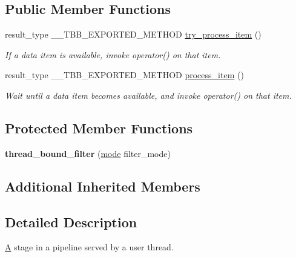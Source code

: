 \subsection*{Public Member Functions}
\begin{DoxyCompactItemize}
\item 
result\+\_\+type \+\_\+\+\_\+\+T\+B\+B\+\_\+\+E\+X\+P\+O\+R\+T\+E\+D\+\_\+\+M\+E\+T\+H\+O\+D \hyperlink{classtbb_1_1thread__bound__filter_a24e2c3a15f273ca9de5e7c99de68d12d}{try\+\_\+process\+\_\+item} ()
\begin{DoxyCompactList}\small\item\em If a data item is available, invoke operator() on that item. \end{DoxyCompactList}\item 
result\+\_\+type \+\_\+\+\_\+\+T\+B\+B\+\_\+\+E\+X\+P\+O\+R\+T\+E\+D\+\_\+\+M\+E\+T\+H\+O\+D \hyperlink{classtbb_1_1thread__bound__filter_ab333776ead226405c5b3a6834cd79edf}{process\+\_\+item} ()
\begin{DoxyCompactList}\small\item\em Wait until a data item becomes available, and invoke operator() on that item. \end{DoxyCompactList}\end{DoxyCompactItemize}
\subsection*{Protected Member Functions}
\begin{DoxyCompactItemize}
\item 
\hypertarget{classtbb_1_1thread__bound__filter_a5f236956f85f28c783127c949e902610}{}{\bfseries thread\+\_\+bound\+\_\+filter} (\hyperlink{classtbb_1_1filter_a8145c736bafcf0b401d50bf1a1df9125}{mode} filter\+\_\+mode)\label{classtbb_1_1thread__bound__filter_a5f236956f85f28c783127c949e902610}

\end{DoxyCompactItemize}
\subsection*{Additional Inherited Members}


\subsection{Detailed Description}
\hyperlink{structA}{A} stage in a pipeline served by a user thread. 



